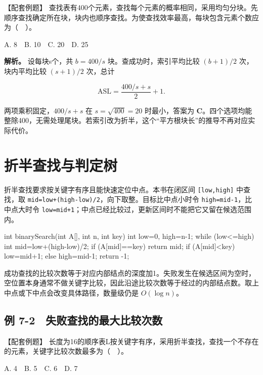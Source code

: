 \begin{example}[配套案例]

【配套例题】 查找表有400个元素，查找每个元素的概率相同，采用均匀分块。先顺序查找确定所在块，块内也顺序查找。为使查找效率最高，每块包含元素个数应为（　）。

A. 8　B. 10　C. 20　D. 25

\end{example}

\textbf{解析。} 设每块s个，共 \(b=400/s\) 块。查成功时，索引平均比较 \((b+1)/2\) 次，块内平均比较 \((s+1)/2\) 次，总计

\[\mathrm{ASL}=\frac{400/s+s}{2}+1.\]

两项乘积固定，\(400/s+s\) 在 \(s=\sqrt{400}=20\) 时最小，答案为 \textbf{C}。四个选项均能整除400，无需处理尾块。若索引改为折半，这个``平方根块长''的推导不再对应实际代价。

\section{折半查找与判定树}\label{DS07-03}

折半查找要求按关键字有序且能快速定位中点。本书在闭区间 \texttt{[low,\allowbreak{}high]} 中查找，取 \texttt{mid=\allowbreak{}low+\allowbreak{}(\allowbreak{}high-low)\allowbreak{}/\allowbreak{}2}，向下取整。目标比中点小时令 \texttt{high=\allowbreak{}mid-1}，比中点大时令 \texttt{low=\allowbreak{}mid+\allowbreak{}1}；中点已经比较过，更新区间时不能把它又留在候选范围内。

\begin{codeblock}[language=C]
int binarySearch(int A[], int n, int key) {
    int low=0, high=n-1;
    while (low<=high) {
        int mid=low+(high-low)/2;
        if (A[mid]==key) return mid;
        if (A[mid]<key) low=mid+1;
        else high=mid-1;
    }
    return -1;
}
\end{codeblock}

成功查找的比较次数等于对应内部结点的深度加1。失败发生在候选区间为空时，空位置本身通常不做关键字比较，因此沿途比较次数等于经过的内部结点数。取上中点或下中点会改变具体路径，数量级仍是 \(O(\log n)\)。

\subsection{例 7-2　失败查找的最大比较次数}\label{DS07-ex2}

\begin{example}[配套案例]

【配套例题】 长度为16的顺序表L按关键字有序，采用折半查找，查找一个不存在的元素，关键字比较次数最多为（　）。

A. 4　B. 5　C. 6　D. 7

\end{example}

